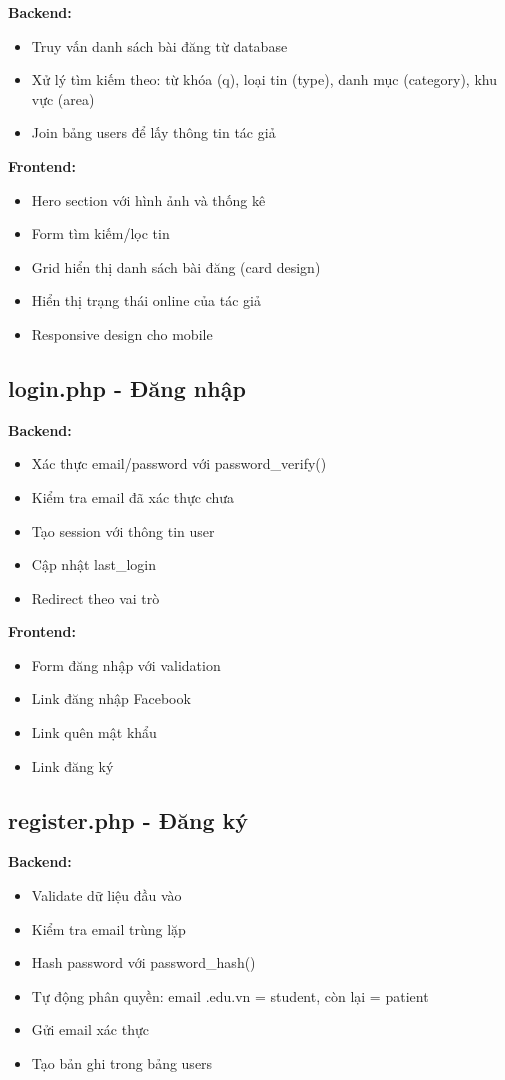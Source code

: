 \documentclass[a4paper,12pt]{article}
\begin{document}
\textbf{Backend:}
\begin{itemize}
    \item Truy vấn danh sách bài đăng từ database
    \item Xử lý tìm kiếm theo: từ khóa (q), loại tin (type), danh mục (category), khu vực (area)
    \item Join bảng users để lấy thông tin tác giả
\end{itemize}

\textbf{Frontend:}
\begin{itemize}
    \item Hero section với hình ảnh và thống kê
    \item Form tìm kiếm/lọc tin
    \item Grid hiển thị danh sách bài đăng (card design)
    \item Hiển thị trạng thái online của tác giả
    \item Responsive design cho mobile
\end{itemize}

\subsection{login.php - Đăng nhập}

\textbf{Backend:}
\begin{itemize}
    \item Xác thực email/password với password\_verify()
    \item Kiểm tra email đã xác thực chưa
    \item Tạo session với thông tin user
    \item Cập nhật last\_login
    \item Redirect theo vai trò
\end{itemize}

\textbf{Frontend:}
\begin{itemize}
    \item Form đăng nhập với validation
    \item Link đăng nhập Facebook
    \item Link quên mật khẩu
    \item Link đăng ký
\end{itemize}

\subsection{register.php - Đăng ký}

\textbf{Backend:}
\begin{itemize}
    \item Validate dữ liệu đầu vào
    \item Kiểm tra email trùng lặp
    \item Hash password với password\_hash()
    \item Tự động phân quyền: email .edu.vn = student, còn lại = patient
    \item Gửi email xác thực
    \item Tạo bản ghi trong bảng users
\end{itemize}
\end{document}
